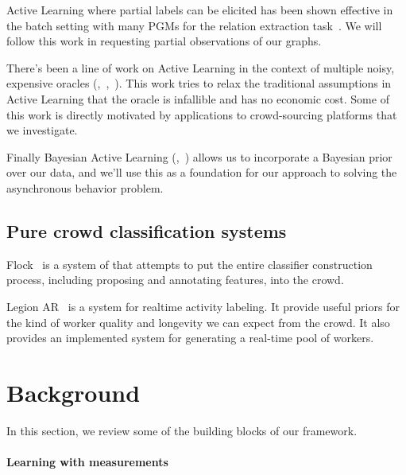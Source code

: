 Active Learning where partial labels can be elicited has been shown effective in the batch setting with many PGMs for the relation extraction task~\cite{angeli2014combining}.
 We will follow this work in requesting partial observations of our graphs.


There's been a line of work on Active Learning in the context of multiple noisy, expensive oracles (\cite{yan2011active},~\cite{donmez2008proactive},~\cite{golovin2010near}).
 This work tries to relax the traditional assumptions in Active Learning that the oracle is infallible and has no economic cost.
 Some of this work is directly motivated by applications to crowd-sourcing platforms that we investigate.


Finally Bayesian Active Learning (\cite{golovin2010near},~\cite{tong2000active}) allows us to incorporate a Bayesian prior over our data, and we'll use this as a foundation for our approach to solving the asynchronous behavior problem.



\subsection{Pure crowd classification systems}

Flock~\cite{chengflock} is a system of that attempts to put the entire classifier construction process, including proposing and annotating features, into the crowd.


Legion AR~\cite{lasecki2013real} is a system for realtime activity labeling.
 It provide useful priors for the kind of worker quality and longevity we can expect from the crowd.
 It also provides an implemented system for generating a real-time pool of workers.

\section{Background}
\label{sec:background}

In this section, we review some of the building blocks of our framework.

\paragraph{Learning with measurements}


